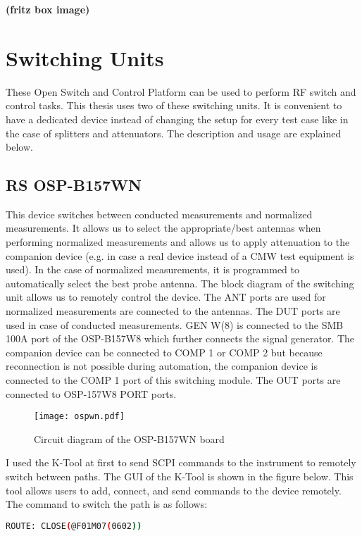 \textbf{(fritz box image)}

\section{Switching Units}
These Open Switch and Control Platform can be used to perform \acs{RF} switch and control tasks. This thesis uses two of these switching units. It is convenient to have a dedicated device instead of changing the setup for every test case like in the case of splitters and attenuators. The description and usage are explained below.

\subsection{\acs{RS}\textregistered{} \ac{OSP}-B157WN} \label{sec:wn}
This device switches between conducted measurements and normalized measurements. It allows us to select the appropriate/best antennas when performing normalized measurements and allows us to apply attenuation to the companion device (e.g. in case a real device instead of a \acs{CMW} test equipment is used). In the case of normalized measurements, it is programmed to automatically select the best probe antenna. The block diagram of the switching unit allows us to remotely control the device. The ANT ports are used for normalized measurements are connected to the antennas. The \acs{DUT} ports are used in case of conducted measurements. GEN W(8) is connected to the SMB 100A port of the \acs{OSP}-B157W8 which further connects the signal generator. The companion device can be connected to COMP 1 or COMP 2 but because reconnection is not possible during automation, the companion device is connected to the COMP 1 port of this switching module. The OUT ports are connected to \acs{OSP}-157W8 PORT ports.

\begin{figure}[H]
\centering
\texttt{[image: ospwn.pdf]}
\caption{Circuit diagram of the \acs{OSP}-B157WN board}
\label{fig:ospwn}
\end{figure}

I used the K-Tool at first to send \acs{SCPI} commands to the instrument to remotely switch between paths. The \acs{GUI} of the K-Tool is shown in the figure below. This tool allows users to add, connect, and send commands to the device remotely. The command to switch the path is as follows: 

\begin{lstlisting}[language=bash]
ROUTE: CLOSE(@F01M07(0602))
\end{lstlisting}


